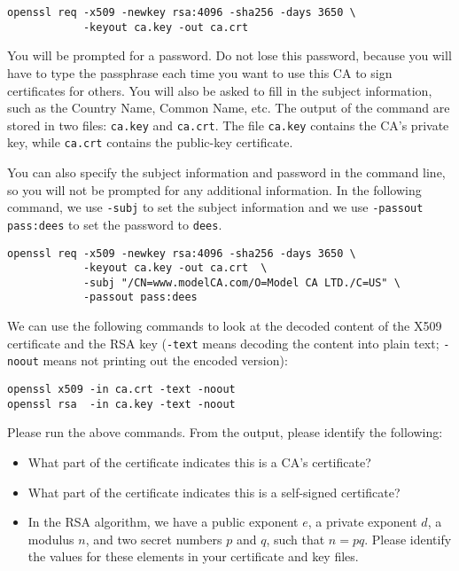 \begin{lstlisting}
openssl req -x509 -newkey rsa:4096 -sha256 -days 3650 \
            -keyout ca.key -out ca.crt  
\end{lstlisting}

You will be prompted for a password. Do not lose this password,
because you will have to type the passphrase 
each time you want to use this CA to sign certificates for others.
You will also be asked to fill in the subject information,
such as the Country Name, Common Name, etc. 
The output of the command are stored in two files: {\tt ca.key} and 
{\tt ca.crt}. The file {\tt ca.key} contains the 
CA's private key, while {\tt ca.crt} contains the public-key certificate.


You can also specify the subject information and password in the command
line, so you will not be prompted for any additional information. In the 
following command, we use \texttt{-subj} to set the subject information
and we use \texttt{-passout pass:dees} to set the password to \texttt{dees}.  

\begin{lstlisting}
openssl req -x509 -newkey rsa:4096 -sha256 -days 3650 \
            -keyout ca.key -out ca.crt  \
            -subj "/CN=www.modelCA.com/O=Model CA LTD./C=US" \
            -passout pass:dees  
\end{lstlisting}


We can use the following commands 
to look at the decoded content of the X509 certificate
and the RSA key (\texttt{-text} means decoding the content
into plain text; \texttt{-noout} means not printing 
out the encoded version): 

\begin{lstlisting}
openssl x509 -in ca.crt -text -noout
openssl rsa  -in ca.key -text -noout 
\end{lstlisting}


Please run the above commands. From the output, please identify
the following:

\begin{itemize}[noitemsep]
\item What part of the certificate indicates this is a CA's certificate?
\item What part of the certificate indicates this is a self-signed certificate?
\item In the RSA algorithm, we have a public exponent $e$, a private 
exponent $d$, a modulus $n$, and two secret numbers $p$ and $q$, such 
that $n = pq$. Please identify the values for these elements in 
your certificate and key files. 
\end{itemize}



